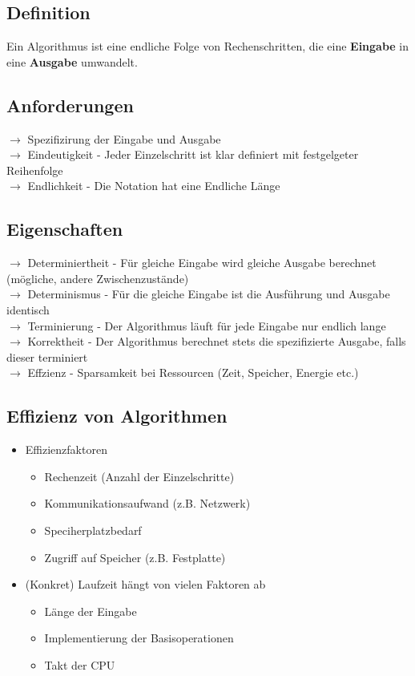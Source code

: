 	\subsection{Definition}
		Ein Algorithmus ist eine endliche Folge von Rechenschritten, die eine \textbf{Eingabe} in eine \textbf{Ausgabe} umwandelt.


	\subsection{Anforderungen}
		$\rightarrow$ Spezifizirung der Eingabe und Ausgabe \\
		$\rightarrow$ Eindeutigkeit - Jeder Einzelschritt ist klar definiert mit festgelgeter Reihenfolge \\
		$\rightarrow$ Endlichkeit - Die Notation hat eine Endliche Länge


	\subsection{Eigenschaften}
		$\rightarrow$ Determiniertheit - Für gleiche Eingabe wird gleiche Ausgabe berechnet (mögliche, andere Zwischenzustände) \\
		$\rightarrow$ Determinismus - Für die gleiche Eingabe ist die Ausführung und Ausgabe identisch \\
		$\rightarrow$ Terminierung - Der Algorithmus läuft für jede Eingabe nur endlich lange \\
		$\rightarrow$ Korrektheit - Der Algorithmus berechnet stets die spezifizierte Ausgabe, falls dieser terminiert \\
		$\rightarrow$ Effzienz - Sparsamkeit bei Ressourcen (Zeit, Speicher, Energie etc.)


	\subsection{Effizienz von Algorithmen}
		\begin{itemize}
			\item Effizienzfaktoren
			\begin{itemize}
				\item Rechenzeit (Anzahl der Einzelschritte)
				\item Kommunikationsaufwand (z.B. Netzwerk)
				\item Speciherplatzbedarf 
				\item Zugriff auf Speicher (z.B. Festplatte) \\
			\end{itemize}
			\item  (Konkret) Laufzeit hängt von vielen Faktoren ab
			\begin{itemize}
				\item Länge der Eingabe 
				\item Implementierung der Basisoperationen
				\item Takt der CPU
			\end{itemize}
		\end{itemize}


